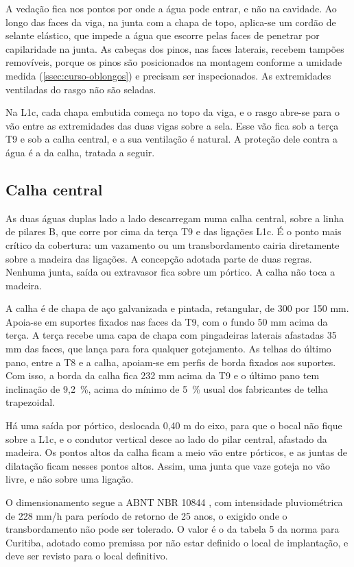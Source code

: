 A vedação fica nos pontos por onde a água pode entrar, e não na cavidade. Ao longo
das faces da viga, na junta com a chapa de topo, aplica-se um cordão de selante
elástico, que impede a água que escorre pelas faces de penetrar por capilaridade
na junta. As cabeças dos pinos, nas faces laterais, recebem tampões removíveis,
porque os pinos são posicionados na montagem conforme a umidade medida
(\autoref{ssec:curso-oblongos}) e precisam ser inspecionados. As extremidades
ventiladas do rasgo não são seladas.

Na L1c, cada chapa embutida começa no topo da viga, e o rasgo abre-se para o vão
entre as extremidades das duas vigas sobre a sela. Esse vão fica sob a terça T9 e
sob a calha central, e a sua ventilação é natural. A proteção dele contra a água
é a da calha, tratada a seguir.

\subsection{Calha central}\label{ssec:calha-central}

As duas águas duplas lado a lado descarregam numa calha central, sobre a linha de
pilares B, que corre por cima da terça T9 e das ligações L1c. É o ponto mais
crítico da cobertura: um vazamento ou um transbordamento cairia diretamente sobre
a madeira das ligações. A concepção adotada parte de duas regras. Nenhuma junta,
saída ou extravasor fica sobre um pórtico. A calha não toca a madeira.

A calha é de chapa de aço galvanizada e pintada, retangular, de 300 por 150 mm.
Apoia-se em suportes fixados nas faces da T9, com o fundo 50 mm acima da terça. A
terça recebe uma capa de chapa com pingadeiras laterais afastadas 35 mm das faces,
que lança para fora qualquer gotejamento. As telhas do último pano, entre a T8 e
a calha, apoiam-se em perfis de borda fixados aos suportes. Com isso, a borda da
calha fica 232 mm acima da T9 e o último pano tem inclinação de 9,2~\%, acima do
mínimo de 5~\% usual dos fabricantes de telha trapezoidal.

Há uma saída por pórtico, deslocada 0,40 m do eixo, para que o bocal não fique
sobre a L1c, e o condutor vertical desce ao lado do pilar central, afastado da
madeira. Os pontos altos da calha ficam a meio vão entre pórticos, e as juntas de
dilatação ficam nesses pontos altos. Assim, uma junta que vaze goteja no vão livre,
e não sobre uma ligação.

O dimensionamento segue a ABNT NBR 10844 \cite{NBR10844:1989}, com intensidade
pluviométrica de 228 mm/h para período de retorno de 25 anos, o exigido onde o
transbordamento não pode ser tolerado. O valor é o da tabela 5 da norma para
Curitiba, adotado como premissa por não estar definido o local de implantação, e
deve ser revisto para o local definitivo.

